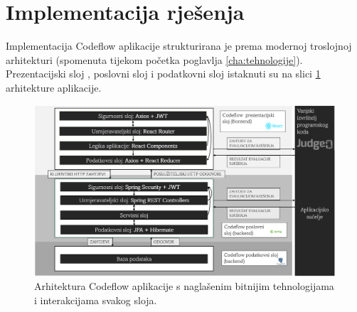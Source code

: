 \documentclass[times, utf8, zavrsni, numeric]{fer}
\begin{document}
		\section{Implementacija rješenja}
		Implementacija Codeflow aplikacije strukturirana je prema modernoj troslojnoj arhitekturi (spomenuta tijekom početka poglavlja \ref{cha:tehnologije}). Prezentacijski sloj , poslovni sloj i podatkovni sloj   istaknuti su na slici \ref{fig:arh} arhitekture aplikacije.
		\begin{figure}[H]
			\centering
			\includegraphics[width=\linewidth]{pictures/prikazi/Arhitektura.png}
			\caption{Arhitektura Codeflow aplikacije s naglašenim bitnijim tehnologijama i interakcijama svakog sloja.}
			\label{fig:arh}
		\end{figure}
	
\end{document}
